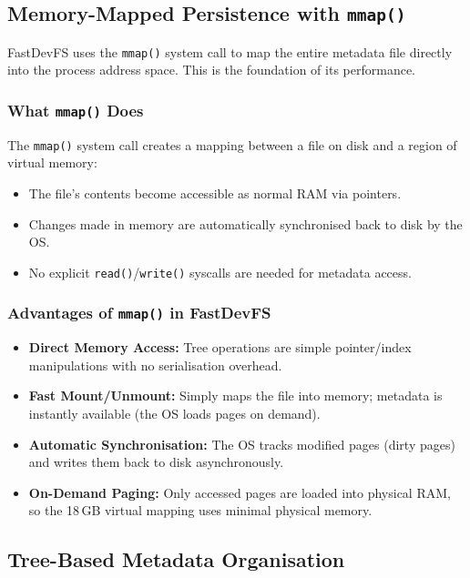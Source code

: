 \documentclass[12pt, a4paper]{article}
\begin{document}
\subsection{Memory-Mapped Persistence with \texttt{mmap()}}

FastDevFS uses the \texttt{mmap()} system call to map the entire metadata file directly into the process address space. This is the foundation of its performance.

\subsubsection{What \texttt{mmap()} Does}

The \texttt{mmap()} system call creates a mapping between a file on disk and a region of virtual memory:
\begin{itemize}
  \item The file's contents become accessible as normal RAM via pointers.
  \item Changes made in memory are automatically synchronised back to disk by the OS.
  \item No explicit \texttt{read()}/\texttt{write()} syscalls are needed for metadata access.
\end{itemize}

\subsubsection{Advantages of \texttt{mmap()} in FastDevFS}

\begin{itemize}
  \item \textbf{Direct Memory Access:} Tree operations are simple pointer/index manipulations with no serialisation overhead.
  \item \textbf{Fast Mount/Unmount:} Simply maps the file into memory; metadata is instantly available (the OS loads pages on demand).
  \item \textbf{Automatic Synchronisation:} The OS tracks modified pages (dirty pages) and writes them back to disk asynchronously.
  \item \textbf{On-Demand Paging:} Only accessed pages are loaded into physical RAM, so the 18\,GB virtual mapping uses minimal physical memory.
\end{itemize}

\subsection{Tree-Based Metadata Organisation}
\end{document}
